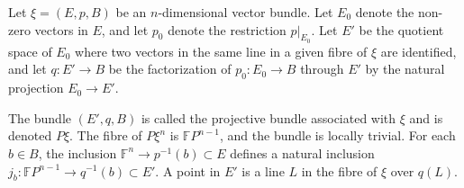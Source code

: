 Let $\xi = (E, p, B)$ be an $n$-dimensional vector bundle. Let $E_0$ denote the non-zero vectors in $E$, and let $p_0$ denote the restriction $p|_{E_0}$. Let $E'$ be the quotient space of $E_0$ where two vectors in the same line in a given fibre of $\xi$ are identified, and let $q: E' \to B$ be the factorization of $p_0: E_0 \to B$ through $E'$ by the natural projection $E_0 \to E'$.

The bundle $(E', q, B)$ is called the projective bundle associated with $\xi$ and is denoted $P\xi$. The fibre of $P\xi^n$ is $\mathbb{F}P^{n-1}$, and the bundle is locally trivial. For each $b \in B$, the inclusion $\mathbb{F}^n \to p^{-1}(b) \subset E$ defines a natural inclusion $j_b: \mathbb{F}P^{n-1} \to q^{-1}(b) \subset E'$. A point in $E'$ is a line $L$ in the fibre of $\xi$ over $q(L)$.
